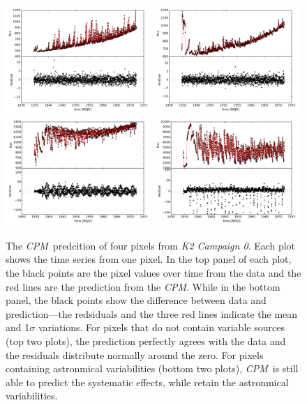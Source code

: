 \documentclass[12pt, preprint]{aastex}
\newcommand{\project}[1]{\textsl{#1}}
\newcommand{\cpm}{\project{CPM}}
\newcommand{\KTCZ}{\project{K2 Campaign 0}}
\begin{document}
\begin{figure}[p]
\begin{center}
\includegraphics[width=0.49\textwidth]{f1a}
\includegraphics[width=0.49\textwidth]{f1b}
\includegraphics[width=0.49\textwidth]{f1c}
\includegraphics[width=0.49\textwidth]{f1d}

\end{center}

\caption{
  \label{lightcurves}
   The \cpm\ predcition of four pixels from \KTCZ. 
  Each plot shows the time series from one pixel.
  In the top panel of each plot, the black points are the pixel values over time from the data and the red lines are the prediction from the \cpm. 
  While in the bottom panel, the black points show the difference between data and prediction---the redsiduals and the three red lines indicate the mean and 1$\sigma$ variations.
  For pixels that do not contain variable sources (top two plots), the prediction perfectly agrees with the data and the residuals distribute normally around the zero. For pixels containing astronmical variabilities (bottom two plots), \cpm\ is still able to predict the systematic effects, while retain the astronmical variabilities.
}
\end{figure}
\end{document}
